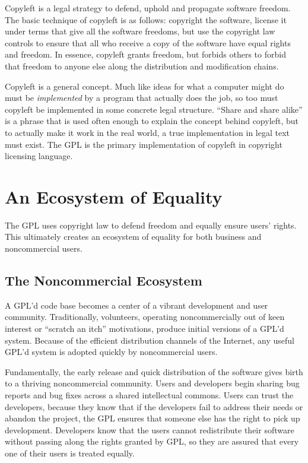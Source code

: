 \documentclass[11pt, letterpaper]{book}
\begin{document}
Copyleft is a legal strategy to defend, uphold and propagate software
freedom. The basic technique of copyleft is as follows: copyright the
software, license it under terms that give all the software freedoms, but
use the copyright law controls to ensure that all who receive a copy of
the software have equal rights and freedom. In essence, copyleft grants
freedom, but forbids others to forbid that freedom to anyone else along
the distribution and modification chains.

Copyleft is a general concept. Much like ideas for what a computer might
do must be \emph{implemented} by a program that actually does the job, so
too must copyleft be implemented in some concrete legal structure.
``Share and share alike'' is a phrase that is used often enough to explain the
concept behind copyleft, but to actually make it work in the real world, a
true implementation in legal text must exist. The GPL is the primary
implementation of copyleft in copyright licensing language.

\section{An Ecosystem of Equality}

The GPL uses copyright law to defend freedom and equally ensure users'
rights. This ultimately creates an ecosystem of equality for both
business and noncommercial users.

\subsection{The Noncommercial Ecosystem}

A GPL'd code base becomes a center of a vibrant development and user
community. Traditionally, volunteers, operating noncommercially out of
keen interest or ``scratch an itch'' motivations, produce initial versions
of a GPL'd system. Because of the efficient distribution channels of the
Internet, any useful GPL'd system is adopted quickly by noncommercial
users.

Fundamentally, the early release and quick distribution of the software
gives birth to a thriving noncommercial community. Users and developers
begin sharing bug reports and bug fixes across a shared intellectual
commons. Users can trust the developers, because they know that if the
developers fail to address their needs or abandon the project, the GPL
ensures that someone else has the right to pick up development.
Developers know that the users cannot redistribute their software without
passing along the rights granted by GPL, so they are assured that every
one of their users is treated equally.
\end{document}
